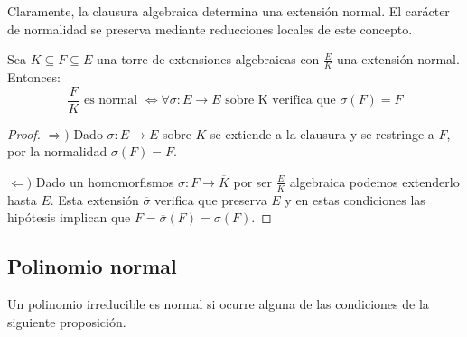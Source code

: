 Claramente, la clausura algebraica determina una extensión normal. El carácter de normalidad se preserva mediante reducciones locales de este concepto. 

\begin{proposition}
Sea $K \subseteq F \subseteq E$ una torre de extensiones algebraicas con $\frac{E}{K}$ una extensión normal. Entonces: $$\frac{F}{K} \text{ es normal } \iff \forall \sigma:E \to E \text{ sobre K verifica que } \sigma(F) = F$$
\end{proposition}
\begin{proof}
$\Rightarrow)$ Dado $\sigma:E \to E$ sobre $K$ se extiende a la clausura y se restringe a $F$, por la normalidad $\sigma(F) = F$. 

$\Leftarrow)$ Dado un homomorfismos $\sigma:F \to \overline{K}$ por ser $\frac{E}{K}$ algebraica podemos extenderlo hasta $E$. Esta extensión $\overline{\sigma}$ verifica que preserva $E$ y en estas condiciones las hipótesis implican que $F = \overline{\sigma}(F) = \sigma(F)$. 
\end{proof}

\subsection{Polinomio normal}

\begin{definition}
Un polinomio irreducible es normal si ocurre alguna de las condiciones de la siguiente proposición. 
\end{definition}

